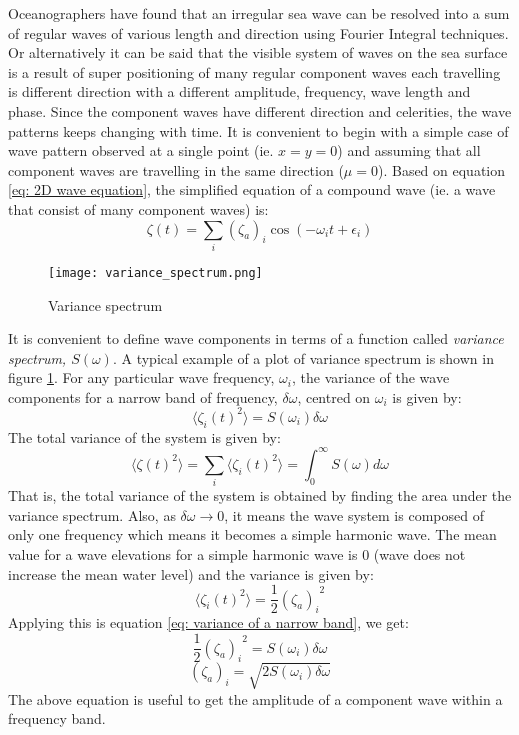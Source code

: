 Oceanographers have found that an irregular sea wave can be resolved into a sum
of regular waves of various length and direction using Fourier Integral
techniques. Or alternatively it can be said that the visible system of waves on
the sea surface is a result of super positioning of many regular component waves
each travelling is different direction with a different amplitude, frequency,
wave length and phase. Since the component waves have different direction and
celerities, the wave patterns keeps changing with time.  It is convenient to
begin with a simple case of wave pattern observed at a single point (ie. $x = y
= 0$) and assuming that all component waves are travelling in the same direction
($\mu = 0$). Based on equation 
\ref{eq: 2D wave equation}, the simplified equation of a compound wave (ie. a 
wave that consist of many component waves) is:
\begin{equation}
  \zeta(t) = \sum _{i} (\zeta_a)_i \cos(-\omega_i t + \epsilon_i)
  \label{eq: 2D irregular wave equation}
\end{equation}

\begin{figure}
  \centering
  \texttt{[image: variance\_spectrum.png]}
  \caption{Variance spectrum}
  \label{fig: variance spectrum}
\end{figure}

It is convenient to define wave components in terms of a function called 
\textit{variance spectrum, $S(\omega)$}. A typical example of a plot of variance
spectrum is shown in figure \ref{fig: variance spectrum}. For any particular 
wave frequency, $\omega_i$, the variance of the wave components for a narrow 
band of frequency, $\delta \omega$, centred on $\omega_i$ is given by:
\begin{equation}
  \langle \zeta_i (t)^2 \rangle = S(\omega_i) \delta \omega
  \label{eq: variance of a narrow band}
\end{equation}
The total variance of the system is given by:
\begin{equation}
  \langle \zeta (t)^2 \rangle = \sum _{i} \langle \zeta_i (t)^2 \rangle = 
  \int _{0}^{\infty} S(\omega) d\omega
\end{equation}
That is, the total variance of the system is obtained by finding the area under
the variance spectrum. Also, as $\delta \omega \to 0$, it means the wave system
is composed of only one frequency which means it becomes a simple harmonic wave. 
The mean value for a wave elevations for a simple harmonic wave is $0$ (wave 
does not increase the mean water level) and the variance is given by:
\begin{equation}
  \langle \zeta_i (t)^2 \rangle = \frac{1}{2} {(\zeta_a)_i }^2
\end{equation}
Applying this is equation \ref{eq: variance of a narrow band}, we get:
\begin{equation}
  \frac{1}{2} {(\zeta_a)_i}^2 = S(\omega_i) \delta \omega
\end{equation}
\begin{equation}
  (\zeta_a)_i = \sqrt{2 S(\omega_i) \delta \omega}
\end{equation}
The above equation is useful to get the amplitude of a component wave within a
frequency band. 

